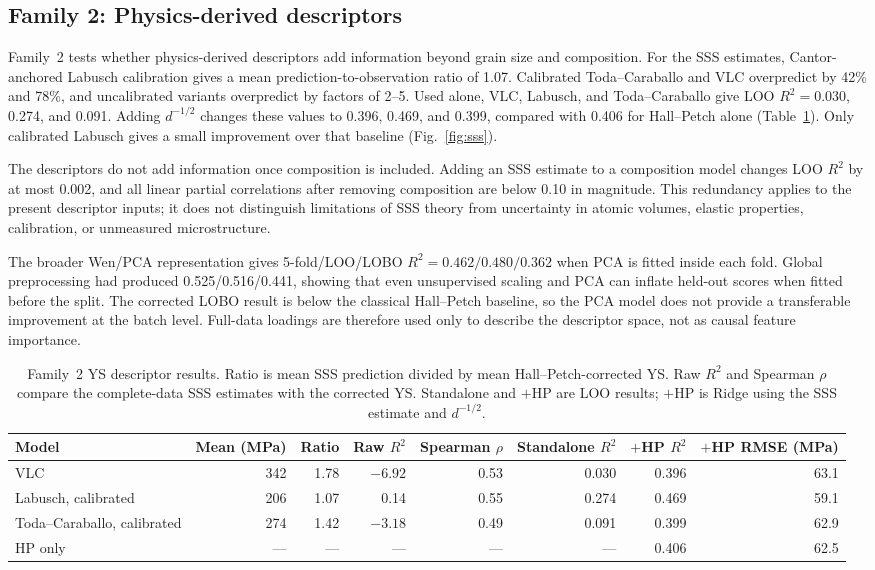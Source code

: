 \documentclass[5p,times,twocolumn]{elsarticle}
\newcommand{\familytwo}{Physics-derived descriptors}
\begin{document}
\subsection{Family 2: \familytwo}

Family~2 tests whether physics-derived descriptors add information beyond grain size and composition. For the SSS estimates, Cantor-anchored Labusch calibration gives a mean prediction-to-observation ratio of 1.07. Calibrated Toda--Caraballo and VLC overpredict by 42\% and 78\%, and uncalibrated variants overpredict by factors of 2--5. Used alone, VLC, Labusch, and Toda--Caraballo give LOO $R^2=0.030$, 0.274, and 0.091. Adding $d^{-1/2}$ changes these values to 0.396, 0.469, and 0.399, compared with 0.406 for Hall--Petch alone (Table~\ref{tab:sss-main}). Only calibrated Labusch gives a small improvement over that baseline (Fig.~\ref{fig:sss}).

The descriptors do not add information once composition is included. Adding an SSS estimate to a composition model changes LOO $R^2$ by at most 0.002, and all linear partial correlations after removing composition are below 0.10 in magnitude. This redundancy applies to the present descriptor inputs; it does not distinguish limitations of SSS theory from uncertainty in atomic volumes, elastic properties, calibration, or unmeasured microstructure.

The broader Wen/PCA representation gives 5-fold/LOO/LOBO $R^2=0.462/0.480/0.362$ when PCA is fitted inside each fold. Global preprocessing had produced 0.525/0.516/0.441, showing that even unsupervised scaling and PCA can inflate held-out scores when fitted before the split. The corrected LOBO result is below the classical Hall--Petch baseline, so the PCA model does not provide a transferable improvement at the batch level. Full-data loadings are therefore used only to describe the descriptor space, not as causal feature importance.

\begin{table}[t]
\centering
\caption{Family~2 YS descriptor results. Ratio is mean SSS prediction divided by mean Hall--Petch-corrected YS. Raw $R^2$ and Spearman $\rho$ compare the complete-data SSS estimates with the corrected YS. Standalone and $+$HP are LOO results; $+$HP is Ridge using the SSS estimate and $d^{-1/2}$.}
\label{tab:sss-main}
\footnotesize
\setlength{\tabcolsep}{4pt}
\begin{tabular}{lrrrrrrr}
\toprule
Model & Mean (MPa) & Ratio & Raw $R^2$ & Spearman $\rho$ & Standalone $R^2$ & $+$HP $R^2$ & $+$HP RMSE (MPa) \\
\midrule
VLC & 342 & 1.78 & $-6.92$ & 0.53 & 0.030 & 0.396 & 63.1 \\
Labusch, calibrated & 206 & 1.07 & 0.14 & 0.55 & 0.274 & 0.469 & 59.1 \\
Toda--Caraballo, calibrated & 274 & 1.42 & $-3.18$ & 0.49 & 0.091 & 0.399 & 62.9 \\
HP only & --- & --- & --- & --- & --- & 0.406 & 62.5 \\
\bottomrule
\end{tabular}
\end{table}
\end{document}
